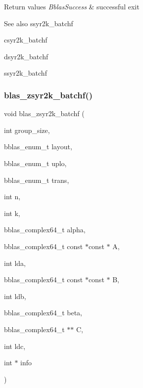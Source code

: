 \begin{DoxyRetVals}{Return values}
{\em Bblas\+Success} & successful exit\\
\hline
\end{DoxyRetVals}
\begin{DoxySeeAlso}{See also}
ssyr2k\+\_\+batchf 

csyr2k\+\_\+batchf 

dsyr2k\+\_\+batchf 

ssyr2k\+\_\+batchf 
\end{DoxySeeAlso}
\mbox{\label{group__syr2k__batchf_ga0da6e0560c631981925ab9da59ef8d16}} 
\subsubsection{\texorpdfstring{blas\+\_\+zsyr2k\+\_\+batchf()}{blas\_zsyr2k\_batchf()}}
{\footnotesize\ttfamily void blas\+\_\+zsyr2k\+\_\+batchf (\begin{DoxyParamCaption}\item[{int}]{group\+\_\+size,  }\item[{bblas\+\_\+enum\+\_\+t}]{layout,  }\item[{bblas\+\_\+enum\+\_\+t}]{uplo,  }\item[{bblas\+\_\+enum\+\_\+t}]{trans,  }\item[{int}]{n,  }\item[{int}]{k,  }\item[{bblas\+\_\+complex64\+\_\+t}]{alpha,  }\item[{bblas\+\_\+complex64\+\_\+t const $\ast$const $\ast$}]{A,  }\item[{int}]{lda,  }\item[{bblas\+\_\+complex64\+\_\+t const $\ast$const $\ast$}]{B,  }\item[{int}]{ldb,  }\item[{bblas\+\_\+complex64\+\_\+t}]{beta,  }\item[{bblas\+\_\+complex64\+\_\+t $\ast$$\ast$}]{C,  }\item[{int}]{ldc,  }\item[{int $\ast$}]{info }\end{DoxyParamCaption})}

